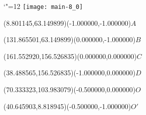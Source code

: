 \documentclass[12pt]{article}
\begin{document}
\makeatletter%
\let\ASYencoding\f@encoding%
\let\ASYfamily\f@family%
\let\ASYseries\f@series%
\let\ASYshape\f@shape%
\makeatother%
{\catcode`"=12%
\texttt{[image: main-8\_0]}%
}%
\kern -170.716535pt%
%
%
\fontsize{10.000000}{12.000000}\selectfont%
\usefont{\ASYencoding}{\ASYfamily}{\ASYseries}{\ASYshape}%
\ASYalign(8.801145,63.149899)(-1.000000,-1.000000){$A$}%
%
%
\fontsize{10.000000}{12.000000}\selectfont%
\ASYalign(131.865501,63.149899)(0.000000,-1.000000){$B$}%
%
%
\fontsize{10.000000}{12.000000}\selectfont%
\ASYalign(161.552920,156.526835)(0.000000,0.000000){$C$}%
%
%
\fontsize{10.000000}{12.000000}\selectfont%
\ASYalign(38.488565,156.526835)(-1.000000,0.000000){$D$}%
%
%
\fontsize{10.000000}{12.000000}\selectfont%
\ASYalign(70.333323,103.983079)(-0.500000,0.000000){$O$}%
%
%
\fontsize{10.000000}{12.000000}\selectfont%
\ASYalign(40.645903,8.818945)(-0.500000,-1.000000){$O'$}%
\end{document}
